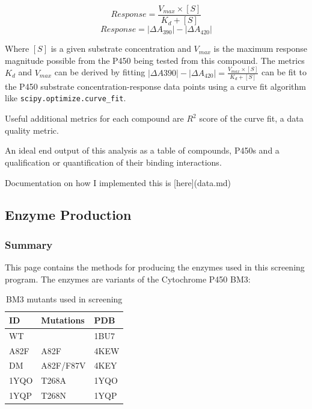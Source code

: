 \documentclass{article}
\begin{document}
\begin{enumerate}
\begin{enumerate}
\begin{enumerate}
		   $$ Response = \frac{V_{max} \times [S]}{K_{d} + [S]}$$
		   $$ Response = |\Delta A_{390}| - |\Delta A_{420}| $$

		   Where $[S]$ is a given substrate concentration and $V_{max}$ is the maximum response magnitude possible from the P450 being tested from this compound.
				The metrics $K_d$ and $V_{max}$ can be derived by fitting $|\Delta A{390}| - |\Delta A_{420}|= \frac{V_{max} \times [S]}{K_{d} + [S]}$ can be fit to the P450 substrate concentration-response  data points using a curve fit algorithm like \texttt{scipy.optimize.curve\_fit}.

		   Useful additional metrics for each compound are $R^2$ score of the curve fit, a data quality metric. 

		   An ideal end output of this analysis as a table of compounds, P450s and a qualification or quantification of their binding interactions.

		   Documentation on how I implemented this is [here](data.md)
		\end{enumerate}
   \end{enumerate}
\end{enumerate}

\subsection{Enzyme Production}

\subsubsection{Summary}

This page contains the methods for producing the enzymes used in this screening program.
The enzymes are variants of the Cytochrome P450 BM3:

\begin{table}
	\begin{center}
		\caption{\label{bm3_table} BM3 mutants used in screening}
		\begin{tabular}{l|p{3cm}|l}
		\textbf{ID} & \textbf{Mutations} & \textbf{PDB} \\
		\hline 
		WT   &           & 1BU7 \\
		A82F &   A82F    & 4KEW \\
		DM   & A82F/F87V & 4KEY \\
		1YQO &   T268A   & 1YQO \\
		1YQP &   T268N   & 1YQP \\
		\end{tabular}
	\end{center}
\end{table}
\end{document}

